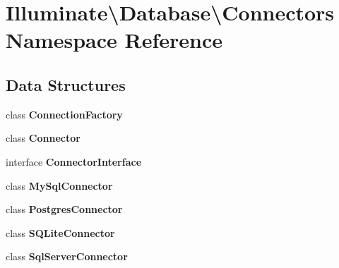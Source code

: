 \section{Illuminate\textbackslash{}Database\textbackslash{}Connectors Namespace Reference}
\label{namespace_illuminate_1_1_database_1_1_connectors}
\subsection*{Data Structures}
\begin{DoxyCompactItemize}
\item 
class {\bf Connection\+Factory}
\item 
class {\bf Connector}
\item 
interface {\bf Connector\+Interface}
\item 
class {\bf My\+Sql\+Connector}
\item 
class {\bf Postgres\+Connector}
\item 
class {\bf S\+Q\+Lite\+Connector}
\item 
class {\bf Sql\+Server\+Connector}
\end{DoxyCompactItemize}
